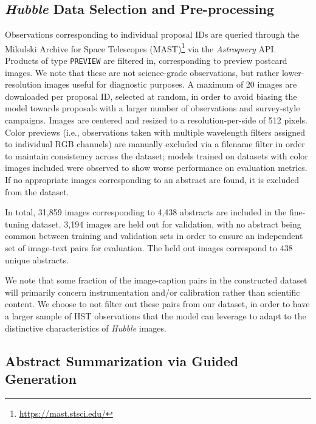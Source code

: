 \documentclass[10pt]{article} %
\newcommand{\package}[1]{\textsl{#1}\xspace}
\newcommand{\hubble}{\emph{Hubble}\xspace}
\begin{document}
\subsection{\hubble Data Selection and Pre-processing}

Observations corresponding to individual proposal IDs are queried through the Mikulski Archive for Space Telescopes (MAST)\footnote{\url{https://mast.stsci.edu/}} via the \package{Astroquery} \citep{2019AJ....157...98G} API.
%
Products of type \texttt{PREVIEW} are filtered in, corresponding to preview postcard images.
%
We note that these are not science-grade observations, but rather lower-resolution images useful for diagnostic purposes.
%
A maximum of 20 images are downloaded per proposal ID, selected at random, in order to avoid biasing the model towards proposals with a larger number of observations and survey-style campaigns.
%
Images are centered and resized to a resolution-per-side of 512 pixels.
%
Color previews (i.e., observations taken with multiple wavelength filters assigned to individual RGB channels) are manually excluded via a filename filter in order to maintain consistency across the dataset; models trained on datasets with color images included were observed to show worse performance on evaluation metrics.
%
If no appropriate images corresponding to an abstract are found, it is excluded from the dataset.

In total, 31,859 images corresponding to 4,438 abstracts are included in the fine-tuning dataset.
%
3,194 images are held out for validation, with no abstract being common between training and validation sets in order to ensure an independent set of image-text pairs for evaluation. The held out images correspond to 438 unique abstracts.  %

We note that some fraction of the image-caption pairs in the constructed dataset will primarily concern instrumentation and/or calibration rather than scientific content.
%
We choose to not filter out these pairs from our dataset, in order to have a larger sample of HST observations that the model can leverage to adapt to the distinctive characteristics of \hubble images.


\subsection{Abstract Summarization via Guided Generation}
\label{sec:summarization}
\end{document}
